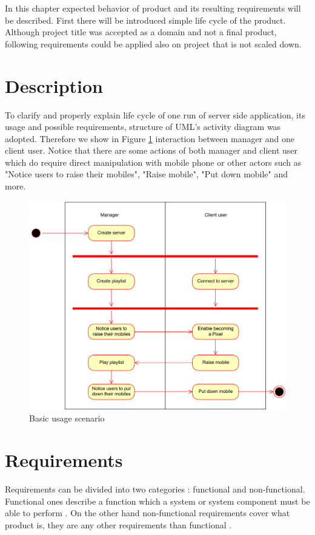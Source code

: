In this chapter expected behavior of product and its resulting requirements will be described. 
First there will be introduced simple life cycle of the product.
Although project title was accepted as a domain and not a final product, following requirements could be applied also on project that is not scaled down.

\section{Description}
To clarify and properly explain life cycle of one run of server side application, its usage and possible requirements, structure of UML's activity diagram \cite{Dumas:2001:UAD:647245.719456} was adopted. 
Therefore we show in Figure \ref{fig:activity_diagram} interaction between manager and one client user.
Notice that there are some actions of both manager and client user which do require direct manipulation with mobile phone or other actors such as "Notice users to raise their mobiles", "Raise mobile", "Put down mobile" and more.

\begin{figure}[h!]
    \begin{center}
    \includegraphics[scale=0.45]{images/activity_diagram.pdf}
    \caption{Basic usage scenario}
    \label{fig:activity_diagram}
    \end{center}
\end{figure}

\section{Requirements} \label{txt:requirements}
Requirements can be divided into two categories \cite[p.~19]{ntnu_req}: functional and non-functional. 
Functional ones describe a function which a system or system component must be able to perform \cite[p.~35]{ieee610.12:1990}.
On the other hand non-functional requirements cover what product is, they are any other requirements than functional  \cite[p.~20]{ntnu_req}.


